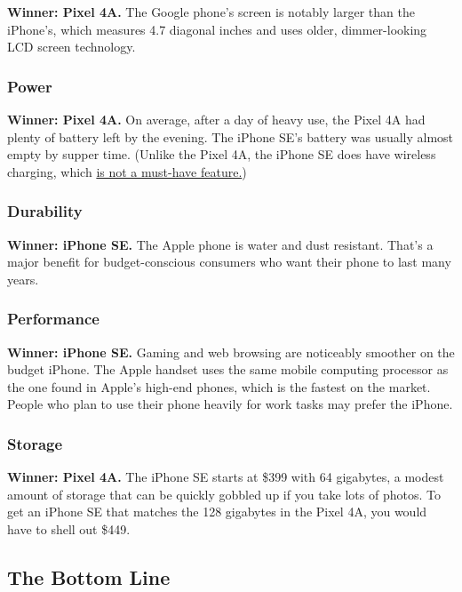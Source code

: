 \textbf{Winner: Pixel 4A.} The Google phone's screen is notably larger
than the iPhone's, which measures 4.7 diagonal inches and uses older,
dimmer-looking LCD screen technology.

\hypertarget{power}{%
\subsubsection{Power}\label{power}}

\textbf{Winner: Pixel 4A.} On average, after a day of heavy use, the
Pixel 4A had plenty of battery left by the evening. The iPhone SE's
battery was usually almost empty by supper time. (Unlike the Pixel 4A,
the iPhone SE does have wireless charging, which
\href{https://www.nytimes.com/2018/10/03/technology/personaltech/wireless-charging-pros-cons.html}{is
not a must-have feature.})

\hypertarget{durability}{%
\subsubsection{Durability}\label{durability}}

\textbf{Winner: iPhone SE.} The Apple phone is water and dust resistant.
That's a major benefit for budget-conscious consumers who want their
phone to last many years.

\hypertarget{performance}{%
\subsubsection{Performance}\label{performance}}

\textbf{Winner: iPhone SE.} Gaming and web browsing are noticeably
smoother on the budget iPhone. The Apple handset uses the same mobile
computing processor as the one found in Apple's high-end phones, which
is the fastest on the market. People who plan to use their phone heavily
for work tasks may prefer the iPhone.

\hypertarget{storage}{%
\subsubsection{Storage}\label{storage}}

\textbf{Winner: Pixel 4A.} The iPhone SE starts at \$399 with 64
gigabytes, a modest amount of storage that can be quickly gobbled up if
you take lots of photos. To get an iPhone SE that matches the 128
gigabytes in the Pixel 4A, you would have to shell out \$449.

\hypertarget{the-bottom-line}{%
\subsection{The Bottom Line}\label{the-bottom-line}}

